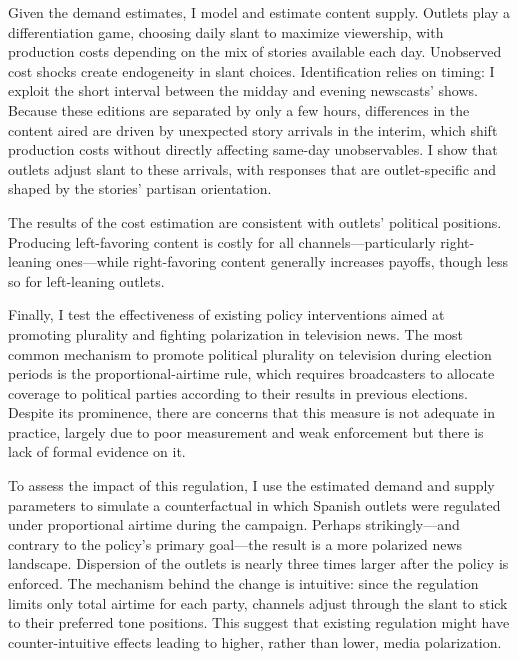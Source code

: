 \documentclass[12pt]{article}
\begin{document}
Given the demand estimates, I model and estimate content supply. Outlets play a differentiation game, choosing daily slant to maximize viewership, with production costs depending on the mix of stories available each day. Unobserved cost shocks create endogeneity in slant choices. Identification relies on timing: I exploit the short interval between the midday and evening newscasts'  shows. Because these editions are separated by only a few hours, differences in the content aired are driven by unexpected story arrivals in the interim, which shift production costs without directly affecting same-day  unobservables. I show that outlets adjust slant to these arrivals, with responses that are outlet-specific and shaped by the stories’ partisan orientation.

The results of the cost estimation are consistent with outlets’ political positions. Producing left-favoring content is costly for all channels—particularly right-leaning ones—while right-favoring content generally increases payoffs, though less so for left-leaning outlets.


Finally, I test the effectiveness of existing policy interventions aimed at promoting plurality and fighting polarization in television news.  The most common mechanism to promote political plurality on television during election periods is the proportional-airtime rule, which requires broadcasters to allocate coverage to political parties according to their results in previous elections. Despite its prominence, there are concerns that this measure is not adequate in practice, largely due to poor measurement and weak enforcement \citep{cage_assemblee} but there is lack of formal evidence on it. 

To assess the impact of this regulation, I use the estimated demand and supply parameters to simulate a counterfactual in which Spanish outlets were regulated under proportional airtime during the campaign. Perhaps strikingly—and contrary to the policy’s primary goal—the result is a more polarized news landscape. Dispersion of the outlets is nearly three times larger after the policy is enforced. The mechanism behind the change is intuitive: since the regulation limits only total airtime for each party, channels adjust through the slant to stick to their preferred tone positions. This suggest that existing regulation might have counter-intuitive effects leading to higher, rather than lower, media polarization. 
\end{document}
